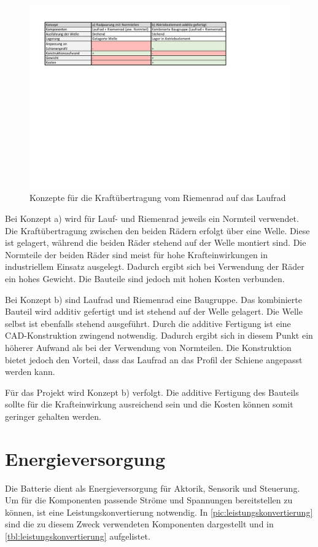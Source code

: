 \begin{figure}[h]
	\begin{center}
		\includegraphics[width=17cm]{abtriebkonzepte.pdf}
		\caption{Konzepte für die Kraftübertragung vom Riemenrad auf das Laufrad}
		\label{pic:abtriebkonzepte}
	\end{center}
\end{figure}


Bei Konzept a) wird für Lauf- und Riemenrad jeweils ein Normteil verwendet. Die Kraftübertragung zwischen den beiden Rädern erfolgt über eine Welle. Diese ist gelagert, während die beiden Räder stehend auf der Welle montiert sind. Die Normteile der beiden Räder sind meist für hohe Krafteinwirkungen in industriellem Einsatz ausgelegt. Dadurch ergibt sich bei Verwendung der Räder ein hohes Gewicht. Die Bauteile sind jedoch mit hohen Kosten verbunden.

Bei Konzept b) sind Laufrad und Riemenrad eine Baugruppe. Das kombinierte Bauteil wird additiv gefertigt und ist stehend auf der Welle gelagert. Die Welle selbst ist ebenfalls stehend ausgeführt. Durch die additive Fertigung ist eine CAD-Konstruktion zwingend notwendig. Dadurch ergibt sich in diesem Punkt ein höherer Aufwand als bei der Verwendung von Normteilen. Die Konstruktion bietet jedoch den Vorteil, dass das Laufrad an das Profil der Schiene angepasst werden kann. 

Für das Projekt wird Konzept b) verfolgt. Die additive Fertigung des Bauteils sollte für die Krafteinwirkung ausreichend sein und die Kosten können somit geringer gehalten werden. 

\newpage

\section{Energieversorgung}
\label{sec:konzeptEnergieversorgung}
Die Batterie dient als Energieversorgung für Aktorik, Sensorik und Steuerung. Um für die Komponenten passende Ströme und Spannungen bereitstellen zu können, ist eine Leistungskonvertierung notwendig. In \autoref{pic:leistungskonvertierung} sind die zu diesem Zweck verwendeten Komponenten dargestellt und in \autoref{tbl:leistungskonvertierung} aufgelistet. 

